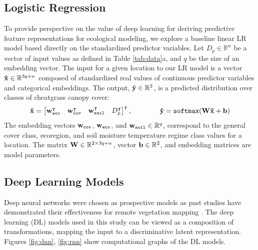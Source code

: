 \documentclass{article} %
\begin{document}
\subsection{Logistic Regression}
To provide perspective on the value of deep learning for deriving predictive feature representations for ecological modeling, 
we explore a baseline linear LR model based directly on the standardized predictor variables. 
Let $D_p \in \mathbb{R}^n$ be a vector of input values as defined in Table \ref{tab:data}a, and $q$ be the size of an embedding vector.
 The input for a given location to our LR model is a vector  ${\bf\hat{x}} \in \mathbb{R}^{3q + n}$ composed of standardized real values of continuous predictor variables and categorical embeddings. The output, ${\bf\hat{y}} \in \mathbb{R}^{2}$, is a predicted distribution over classes of cheatgrass canopy cover:
\begin{equation}\label{eqn:lr}
{\bf\hat{x}}  = \begin{bmatrix}{\bf w}_{\texttt{eco}}^{\intercal}&{\bf w}_{\texttt{cov}}^{\intercal}&{\bf w}_{\texttt{soil}}^{\intercal}& D_p^{\intercal}\end{bmatrix}^{\intercal}, \hspace{40pt}
 {\bf\hat{y}} = \texttt{softmax}({\bf W} {\bf\hat{x}} + {\bf b})
\end{equation}
The embedding vectors ${\bf w}_{\texttt{cov}}$, ${\bf w}_{\texttt{eco}}$, and ${\bf w}_{\texttt{soil}}\in \mathbb{R}^{q}$, correspond to the general cover class, ecoregion, and soil moisture temperature regime class values for a location.  
The matrix ${\bf W} \in \mathbb{R}^{2 \times 3q + n}$, vector ${\bf b}\in \mathbb{R}^{2}$, and embedding matrices are model parameters. 

\subsection{Deep Learning Models}
Deep neural networks were chosen as prospective models as past studies have demonstrated their effectiveness for remote vegetation mapping \citep{kussul2017deep}.
The deep learning (DL) models used in this study can be viewed as a composition of transformations, 
mapping the input to a discriminative latent representation. Figures \ref{fig:dnn}, \ref{fig:rnn} show computational graphs of the DL models.
\end{document}
